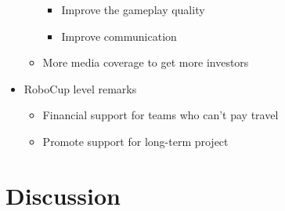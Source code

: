 \documentclass{article}
\begin{document}
\begin{itemize}
\begin{itemize}
       \begin{itemize} 
           \item Improve the gameplay quality
           \item Improve communication
   \end{itemize}
       \item More media coverage to get more investors
\end{itemize}
   \item RoboCup level remarks
   \begin{itemize} 
       \item Financial support for teams who can't pay travel
       \item Promote support for long-term project 
   \end{itemize}
\end{itemize}

\section{Discussion}
\end{document}

